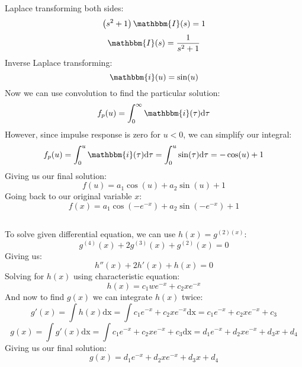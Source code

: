 \documentclass[12pt]{article}
\begin{document}
Laplace transforming both sides:
\begin{equation}
    \left(s^2+1\right)\mathbbm{I}(s) = 1
\end{equation}
\begin{equation}
    \mathbbm{I}(s) = \frac{1}{s^2+1}
\end{equation}
Inverse Laplace transforming:
\begin{equation}
    \mathbbm{i}(u) = \sin(u)
\end{equation}
Now we can use convolution to find the particular solution:
\begin{equation}
    f_p(u) = \int_{0}^{\infty} \mathbbm{i}(\tau)\mathrm{d}\tau
\end{equation}
However, since impulse response is zero for $u < 0$, we can simplify our integral:
\begin{equation}
    f_p(u) = \int_{0}^{u} \mathbbm{i}(\tau)\mathrm{d}\tau = \int_{0}^{u} \sin(\tau)\mathrm{d}\tau = -\cos(u) + 1
\end{equation}
Giving us our final solution:
\begin{equation}
    f(u) = a_1\cos(u) + a_2\sin(u) + 1
\end{equation}
Going back to our original variable $x$:
\begin{equation}
    f(x) = a_1\cos(-e^{-x}) + a_2\sin(-e^{-x}) + 1
\end{equation}
\subsection{}
To solve given differential equation, we can use $h(x) = g^{(2)(x)}$:
\begin{equation}
    g^{(4)}(x) + 2g^{(3)}(x) + g^{(2)}(x) = 0
\end{equation}
Giving us:
\begin{equation}
    h''(x) + 2h'(x) + h(x) = 0
\end{equation}
Solving for $h(x)$ using characteristic equation:
\begin{equation}
    h(x) = c_1we^{-x} + c_2xe^{-x}
\end{equation}
And now to find $g(x)$ we can integrate $h(x)$ twice:
\begin{equation}
    g'(x) = \int h(x) \mathrm{dx} = \int c_1e^{-x} + c_2xe^{-x} \mathrm{dx} = c_1e^{-x} + c_2xe^{-x} + c_3
\end{equation}
\begin{equation}
    g(x) = \int g'(x) \mathrm{dx} = \int c_1e^{-x} + c_2xe^{-x} + c_3 \mathrm{dx} = d_1e^{-x} + d_2xe^{-x} + d_3x + d_4
\end{equation}
Giving us our final solution:
\begin{equation}
    g(x) = d_1e^{-x} + d_2xe^{-x} + d_3x + d_4
\end{equation}
\end{document}
